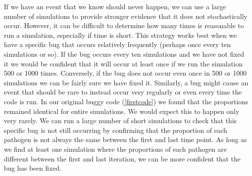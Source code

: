 \documentclass[
]{article}
\begin{document}
If we have an event that we know should never happen, we can use a large number of simulations to provide stronger evidence that it does not stochastically occur.
However, it can be difficult to determine how many times is reasonable to run a simulation, especially if time is short.
This strategy works best when we have a specific bug that occurs relatively frequently (perhaps once every ten simulations or so).
If the bug occurs every ten simulations and we have not fixed it we would be confident that it will occur at least once if we run the simulation 500 or 1000 times.
Conversely, if the bug does not occur even once in 500 or 1000 simulations we can be fairly sure we have fixed it.
\newline
\newline
Similarly, a bug might cause an event that should be rare to instead occur very regularly or even every time the code is run.
In our original buggy code (\ref{firstcode}) we found that the proportions remained identical for entire simulations.
We would expect this to happen only very rarely.
We can run a large number of short simulations to check that this specific bug is not still occurring by confirming that the proportion of each pathogen is not always the same between the first and last time point.
As long as we find at least one simulation where the proportions of each pathogen are different between the first and last iteration, we can be more confident that the bug has been fixed.
\newline
{}\label{returningpathogen}
\end{document}
